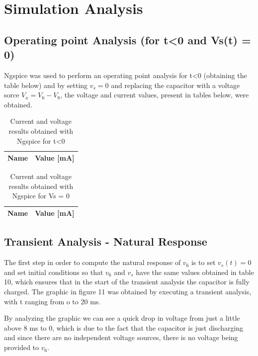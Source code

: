 \section{Simulation Analysis}
\label{sec:simulation}

\subsection{Operating point Analysis (for t<0 and Vs(t) = 0)}

Ngspice was used to perform an operating point analysis for t<0 (obtaining the table below) and by setting $v_s = 0$ and replacing the capacitor with a voltage sorce $V_x = V_6 - V_8$, the voltage and current values, present in tables below, were obtained.

\begin{table}[!h]
	\centering
	\begin{tabular}{|l|r|}
		\hline    
		{\bf Name} & {\bf Value [mA]} \\ \hline
		
	\end{tabular}
	\caption{Current and voltage results obtained with Ngspice for t<0 }
	\label{tab:op}
\end{table}



\begin{table}[!h]
	\centering
	\begin{tabular}{|l|r|}
		\hline    
		{\bf Name} & {\bf Value [mA]} \\ \hline
		
	\end{tabular}
	\caption{Current and voltage results obtained with Ngspice for Vs = 0}
	\label{tab:op}
\end{table}


\subsection{Transient Analysis - Natural Response}

The first step in order to compute the natural response of $v_6$ is to set $v_s(t) = 0$ and set initial conditions so that $v_6$ and $v_s$ have the same values obtained in table 10, which ensures that in the start of the transient analysis the capacitor is fully charged. The graphic in figure 11 was obtained by executing a transient analysis, with t ranging from o to 20 ms.

By analyzing the graphic we can see a quick drop in voltage from just a little above 8 ms to 0, which is due to the fact that the capacitor is just discharging and since there are no independent voltage sources, there is no voltage being provided to $v_6$.

